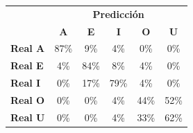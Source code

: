 \begin{tabular}{lccccc}
\toprule
 & \multicolumn{5}{c}{\textbf{Predicción}} \\
 & \textbf{A} & \textbf{E} & \textbf{I} & \textbf{O} & \textbf{U} \\
\midrule
\textbf{Real A} & \cellcolor[rgb]{0.39,0.39,1.00} \color{white} 87\% & \cellcolor[rgb]{0.94,0.94,1.00}  9\% & \cellcolor[rgb]{0.97,0.97,1.00}  4\% & \cellcolor[rgb]{1.00,1.00,1.00}  0\% & \cellcolor[rgb]{1.00,1.00,1.00}  0\% \\
\textbf{Real E} & \cellcolor[rgb]{0.97,0.97,1.00}  4\% & \cellcolor[rgb]{0.41,0.41,1.00} \color{white} 84\% & \cellcolor[rgb]{0.94,0.94,1.00}  8\% & \cellcolor[rgb]{0.97,0.97,1.00}  4\% & \cellcolor[rgb]{1.00,1.00,1.00}  0\% \\
\textbf{Real I} & \cellcolor[rgb]{1.00,1.00,1.00}  0\% & \cellcolor[rgb]{0.88,0.88,1.00}  17\% & \cellcolor[rgb]{0.45,0.45,1.00} \color{white} 79\% & \cellcolor[rgb]{0.97,0.97,1.00}  4\% & \cellcolor[rgb]{1.00,1.00,1.00}  0\% \\
\textbf{Real O} & \cellcolor[rgb]{1.00,1.00,1.00}  0\% & \cellcolor[rgb]{1.00,1.00,1.00}  0\% & \cellcolor[rgb]{0.97,0.97,1.00}  4\% & \cellcolor[rgb]{0.69,0.69,1.00}  44\% & \cellcolor[rgb]{0.64,0.64,1.00} \color{white} 52\% \\
\textbf{Real U} & \cellcolor[rgb]{1.00,1.00,1.00}  0\% & \cellcolor[rgb]{1.00,1.00,1.00}  0\% & \cellcolor[rgb]{0.97,0.97,1.00}  4\% & \cellcolor[rgb]{0.77,0.77,1.00}  33\% & \cellcolor[rgb]{0.56,0.56,1.00} \color{white} 62\% \\
\bottomrule
\end{tabular}